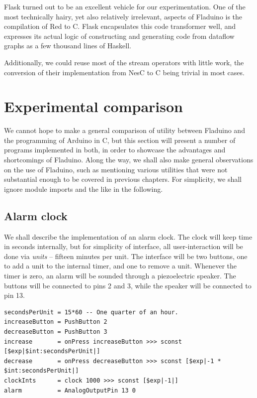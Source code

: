 \documentclass[a4paper, oneside, final]{memoir}
\begin{document}
Flask turned out to be an excellent vehicle for our experimentation.
One of the most technically hairy, yet also relatively irrelevant,
aspects of Fladuino is the compilation of Red to C.  Flask
encapsulates this code transformer well, and expresses its actual
logic of constructing and generating code from dataflow graphs as a
few thousand lines of Haskell.

Additionally, we could reuse most of the stream operators with little
work, the conversion of their implementation from NesC to C being
trivial in most cases.

\section{Experimental comparison}

We cannot hope to make a general comparison of utility between
Fladuino and the programming of Arduino in C, but this section will
present a number of programs implemented in both, in order to showcase
the advantages and shortcomings of Fladuino.  Along the way, we shall
also make general observations on the use of Fladuino, such as
mentioning various utilities that were not substantial enough to be
covered in previous chapters.  For simplicity, we shall ignore module
imports and the like in the following.

\subsection{Alarm clock}

We shall describe the implementation of an alarm clock.  The clock
will keep time in seconds internally, but for simplicity of interface,
all user-interaction will be done via \textit{units} -- fifteen
minutes per unit.  The interface will be two buttons, one to add a
unit to the internal timer, and one to remove a unit.  Whenever the
timer is zero, an alarm will be sounded through a piezoelectric
speaker.  The buttons will be connected to pins 2 and 3, while the
speaker will be connected to pin 13.

\begin{verbatim}
secondsPerUnit = 15*60 -- One quarter of an hour.
increaseButton = PushButton 2
decreaseButton = PushButton 3
increase       = onPress increaseButton >>> sconst [$exp|$int:secondsPerUnit|]
decrease       = onPress decreaseButton >>> sconst [$exp|-1 * $int:secondsPerUnit|]
clockInts      = clock 1000 >>> sconst [$exp|-1|]
alarm          = AnalogOutputPin 13 0
\end{verbatim}
\end{document}

